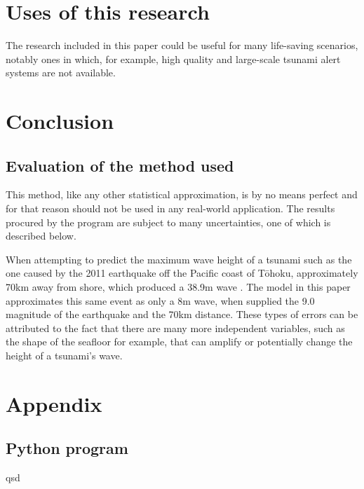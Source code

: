 \documentclass[11pt,letterpaper]{article}
\begin{document}
\section{Uses of this research}

The research included in this paper could be useful for many life-saving scenarios, 
notably ones in which, for example, high quality and large-scale tsunami alert 
systems are not available. 

\section{Conclusion}

\subsection{Evaluation of the method used}

This method, like any other statistical approximation, is by no means perfect 
and for that reason should not be used in any real-world application. The results 
procured by the program are subject to many uncertainties, one of which is described 
below.

When attempting to predict the maximum wave height of a tsunami such as the one 
caused by the 2011 earthquake off the Pacific coast of Tōhoku, approximately 70km 
away from shore, which produced a 38.9m wave \cite{yomiuri_2011}. The model in this 
paper approximates this same event as only a 8m wave, when supplied the 9.0 magnitude 
of the earthquake and the 70km distance. These types of errors can be attributed to the 
fact that there are many more independent variables, such as the shape of the seafloor for 
example, that can amplify or potentially change the height of a tsunami's wave. 

\printbibliography[heading=bibintoc, title=Works Cited]

\appendix
\section{Appendix}
\label{app}
\subsection{Python program}
\label{app:scripts}
qsd

\end{document}
